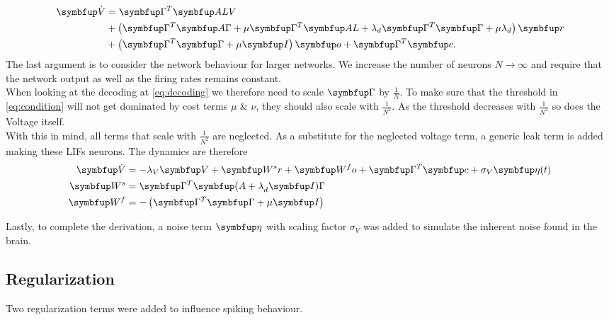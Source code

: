 \begin{equation}\label{eq:voltage_limit}
\begin{aligned}
	\bmu{\dot{V}} &= \bmu{\Gamma}^T\bmu{ALV}\\
	 &+ \left(\bmu{\Gamma}^T\bmu{A\Gamma} + \mu\bmu{\Gamma}^T \bmu{AL}+\lambda_d\bmu{\Gamma}^T\bmu{\Gamma} + \mu\lambda_d\right)\bmu{r}\\
	 &+\left(\bmu{\Gamma}^T\bmu{\Gamma} + \mu\bmu{I}\right)\bmu{o} + \bmu{\Gamma}^T\bmu{c}.
\end{aligned}
\end{equation}
The last argument is to consider the network behaviour for larger networks. We increase the number of neurons $N\longrightarrow\infty$ and require that the network output as well as the firing rates remains constant.\\
When looking at the decoding at \cref{eq:decoding} we therefore need to scale $\bmu{\Gamma}$ by $\frac{1}{N}$. To make sure that the threshold in \cref{eq:condition} will not get dominated by cost terms $\mu$ \& $\nu$, they should also scale with $\frac{1}{N^2}$. As the threshold decreases with $\frac{1}{N^2}$ so does the Voltage itself.\\
With this in mind, all terms that scale with $\frac{1}{N^2}$ are neglected. As a substitute for the neglected voltage term, a generic leak term is added making these \acp{LIF} neurons. The dynamics are therefore
\begin{equation}\label{eq:simple_sim}
\begin{aligned}
	\bmu{\dot{V}} &= -\lambda_V \bmu{V} + \bmu{W^sr} + \bmu{W^fo} + \bmu{\Gamma}^T \bmu{c} + \sigma_V\bmu{\eta}(t)\\
	\bmu{W^s} &= \bmu{\Gamma}^T\bmu{(A+\lambda}_d\bmu{I)\Gamma}\\
	\bmu{W^f} & = -\left(\bmu{\Gamma}^T\bmu{\Gamma} + \mu\bmu{I}\right)
\end{aligned}
\end{equation}

Lastly, to complete the derivation, a noise term $\bmu{\eta}$ with scaling factor $\sigma_V$ was added to simulate the inherent noise found in the brain.

\subsection{Regularization}\label{sssection:regularization}

Two regularization terms were added to influence spiking behaviour.

